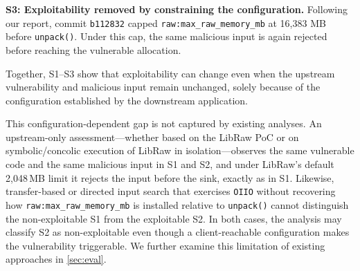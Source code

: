 \vspace{5px}
\noindent\textbf{S3: Exploitability removed by constraining the configuration.}
Following our report, commit \texttt{b112832} capped
\texttt{raw:max\_raw\_memory\_mb} at 16,383 MB before
\texttt{unpack()}. Under this cap, the same malicious input is again rejected before reaching the vulnerable allocation.

\vspace{6.3px}
Together, S1--S3 show that exploitability can change even when the upstream vulnerability and malicious input remain unchanged, solely because of the configuration established by the downstream application.

This configuration-dependent gap is not captured by existing analyses.
An upstream-only assessment---whether based on the LibRaw PoC or on symbolic/concolic execution of LibRaw in isolation---observes the same vulnerable code and the same malicious input in S1 and S2, and under LibRaw's default 2{,}048\,MB limit it rejects the input before the sink, exactly as in S1.
Likewise, transfer-based or directed input search that exercises \texttt{OIIO} without recovering how \texttt{raw:max\_raw\_memory\_mb} is installed relative to \texttt{unpack()} cannot distinguish the non-exploitable S1 from the exploitable S2.
In both cases, the analysis may classify S2 as non-exploitable even though a client-reachable configuration makes the vulnerability triggerable.
We further examine this limitation of existing approaches in \autoref{sec:eval}.

